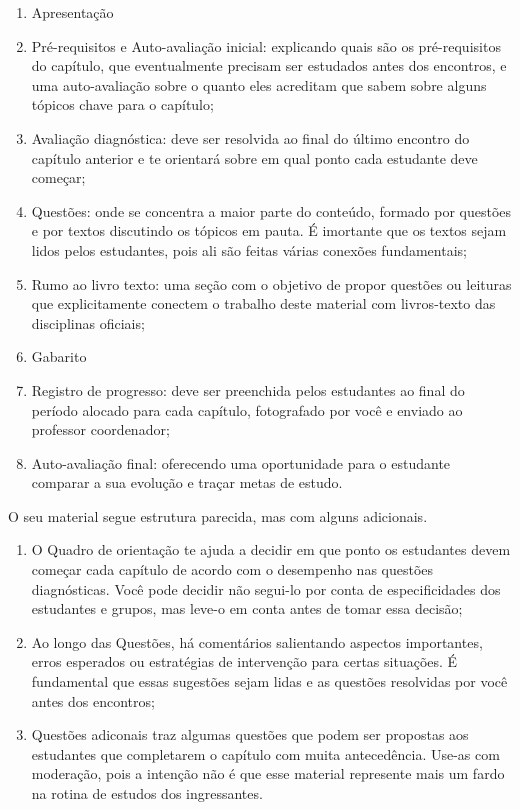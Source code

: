 \documentclass[openany]{book}
\begin{document}
\begin{enumerate}
 \item Apresentação
 \item Pré-requisitos e Auto-avaliação inicial: explicando quais são os pré-requisitos do capítulo, que eventualmente precisam ser estudados antes dos encontros, e uma auto-avaliação sobre o quanto eles acreditam que sabem sobre alguns tópicos chave para o capítulo;
 \item Avaliação diagnóstica: deve ser resolvida ao final do último encontro do capítulo anterior e te orientará sobre em qual ponto cada estudante deve começar;
 \item Questões: onde se concentra a maior parte do conteúdo, formado por questões e por textos discutindo os tópicos em pauta. É imortante que os textos sejam lidos pelos estudantes, pois ali são feitas várias conexões fundamentais;
 \item Rumo ao livro texto: uma seção com o objetivo de propor questões ou leituras que explicitamente conectem o trabalho deste material com livros-texto das disciplinas oficiais;
 \item Gabarito
 \item Registro de progresso: deve ser preenchida pelos estudantes ao final do período alocado para cada capítulo, fotografado por você e enviado ao professor coordenador;
 \item Auto-avaliação final: oferecendo uma oportunidade para o estudante comparar a sua evolução e traçar metas de estudo.
\end{enumerate}

O seu material segue estrutura parecida, mas com alguns adicionais.

\begin{enumerate}
 \item O Quadro de orientação te ajuda a decidir em que ponto os estudantes devem começar cada capítulo de acordo com o desempenho nas questões diagnósticas. Você pode decidir não segui-lo por conta de especificidades dos estudantes e grupos, mas leve-o em conta antes de tomar essa decisão;
 \item Ao longo das Questões, há comentários salientando aspectos importantes, erros esperados ou estratégias de intervenção para certas situações. É fundamental que essas sugestões sejam lidas e as questões resolvidas por você antes dos encontros;
 \item Questões adiconais traz algumas questões que podem ser propostas aos estudantes que completarem o capítulo com muita antecedência. Use-as com moderação, pois a intenção não é que esse material represente mais um fardo na rotina de estudos dos ingressantes.
\end{enumerate}
\end{document}

